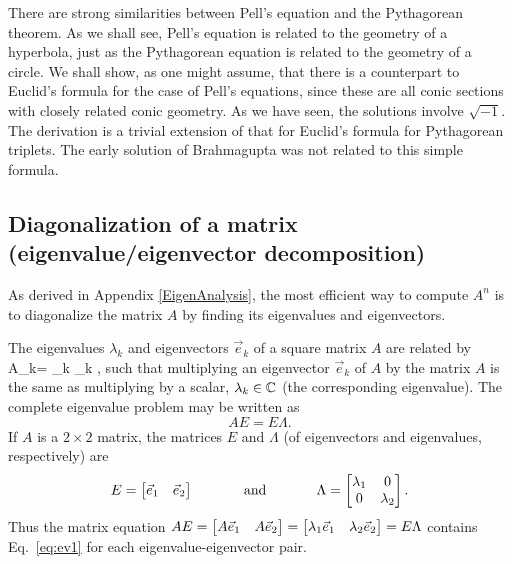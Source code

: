 \documentclass{ximera}
\begin{document}
There are strong similarities between Pell's equation and the Pythagorean theorem. 
As we shall see,
Pell's equation is related to the geometry of a hyperbola, just as the Pythagorean equation is
related to the geometry of a circle.
We shall show, as one might assume, that there is a counterpart to Euclid's formula for the case of Pell's equations,
since these are all conic sections with closely related conic geometry. As we have seen, the solutions
involve $\sqrt{-1}$.  The derivation is a trivial extension of that for Euclid's formula for
Pythagorean triplets.  The early solution of Brahmagupta was not related to this simple formula.





\subsection{Diagonalization of a matrix (eigenvalue/eigenvector decomposition)}
As derived in Appendix \ref{EigenAnalysis}, the most efficient way to compute $A^n$ is to
diagonalize the matrix $A$ by finding its eigenvalues and eigenvectors.

The eigenvalues $\lambda_k$ and eigenvectors $\vec{e}_k$ of a square matrix $A$ are related by
\be
A_k= \lambda_k _k , \label{eq:ev1}
\ee
such that multiplying an eigenvector $\vec{e}_k$ of $A$ by the matrix $A$ is the same as multiplying by a scalar, $\lambda_k \in \mathbb{C}$ (the corresponding eigenvalue). %
The complete eigenvalue problem may be written as
 \[
AE=E\Lambda.
 \]
 If $A$ is a $2\times2$ matrix,%
  the matrices $E$ and $\Lambda$ (of eigenvectors and eigenvalues, respectively) are%
\[ E =  
\begin{bmatrix}
\vec{e}_1& \vec{e}_2
\end{bmatrix}
\hspace{.5in}
\text{and}
\hspace{.5in}
\Lambda =
\begin{bmatrix}
\lambda_1 & 0 \\
0 & \lambda_2  
\end{bmatrix}.
\]
Thus the matrix equation
$AE=
\begin{bmatrix}
A\vec{e}_1 & A\vec{e}_2
\end{bmatrix}
= \begin{bmatrix}
\lambda_1\vec{e}_1 & \lambda_2\vec{e}_2
\end{bmatrix}
= E\Lambda$
contains Eq.~\ref{eq:ev1} for each eigenvalue-eigenvector pair.
\end{document}
